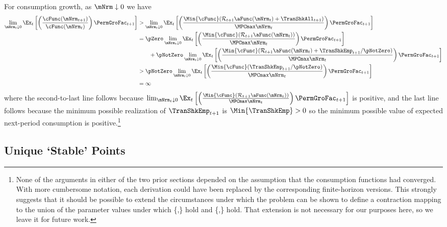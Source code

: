 \documentclass[BufferStockTheory]{subfiles}
\begin{document}
For consumption growth, as $\mNrm \downarrow 0$ we have
\begin{align*}
  \lim_{\mNrm_{t} \downarrow 0} \Ex_{t}\left[\left(\frac{\cFunc({\mNrm}_{t+1})}{\cFunc(\mNrm_t)}\right){\PermGroFac}_{t+1}\right]
  & > \lim_{\mNrm_{t} \downarrow 0} \Ex_{t}\left[\left(\frac{\Min{\cFunc}({\mathcal{\mathcal{R}}}_{t+1}\aFunc(\mNrm_{t})+{%
    \TranShkAll}_{t+1})}{\MPCmax \mNrm_{t}}\right){\PermGroFac}_{t+1}\right]  \notag \\
  & = \pZero \lim_{\mNrm_{t} \downarrow 0} \Ex_{t}\left[\left(\frac{\Min{\cFunc}({\mathcal{\mathcal{R}}}_{t+1}\aFunc(\mNrm_{t}))}{\MPCmax \mNrm_{t}}\right){\PermGroFac}_{t+1}\right] \\
  & ~~~~~~ + \pNotZero \lim_{\mNrm_{t} \downarrow 0}  \Ex_{t}\left[\left(\frac{\Min{\cFunc}({\mathcal{\mathcal{R}}}_{t+1}\aFunc(\mNrm_{t})+
    \TranShkEmp_{t+1}/\pNotZero)}{\MPCmax \mNrm_{t}}\right){\PermGroFac}_{t+1}\right]  \\\notag
  & > \pNotZero \lim_{\mNrm_{t} \downarrow 0} \Ex_{t}\left[\left(\frac{\Min{\cFunc}(
    \TranShkEmp_{t+1}/\pNotZero)}{\MPCmax \mNrm_{t}}\right){\PermGroFac}_{t+1}\right] \\
  & = \infty \nonumber
\end{align*}
where the second-to-last line follows because  $\lim_{\mNrm_{t} \downarrow 0} \Ex_{t}\left[\left(\frac{\Min{\cFunc}({\mathcal{\mathcal{R}}}_{t+1}\aFunc(\mNrm_{t}))}{\MPCmax \mNrm_{t}}\right){\PermGroFac}_{t+1}\right]$ is positive, and the last line follows because the minimum possible realization of $\TranShkEmp_{t+1}$ is $\Min{\TranShkEmp}>0$ so the minimum possible value of expected next-period consumption is positive.\footnote{None of the arguments in either of the two prior sections depended on the assumption that the consumption functions had converged.
With more cumbersome notation, each derivation could have been replaced by the corresponding finite-horizon versions.
This strongly suggests that it should be possible to extend the circumstances under which the problem can be shown to define a contraction mapping to the union of the parameter values under which \{\RIC,\FHWC\} hold and \{\FVAC,\WRIC\} hold.
That extension is not necessary for our purposes here, so we leave it for future work.}


\hypertarget{onetarget}{}
\hypertarget{Unique-Stable-Points}{}

\subsection{Unique `Stable' Points}\label{subsec:onetarget}\hypertarget{TheoremTarget}{}
\end{document}
